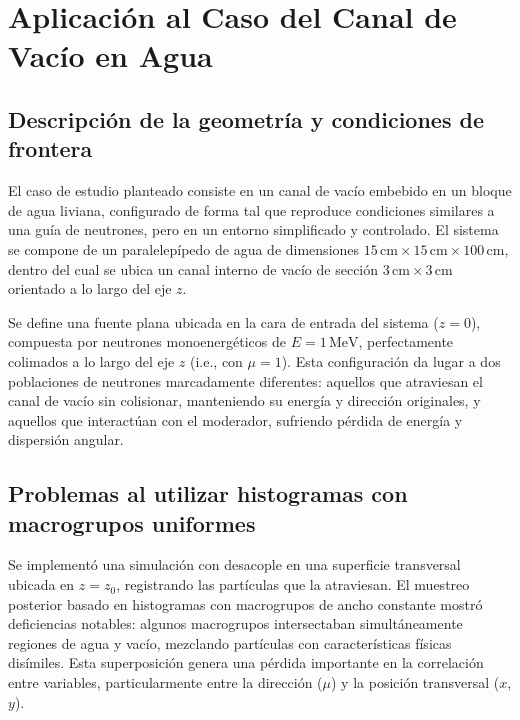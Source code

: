 \chapter{Aplicación al Caso del Canal de Vacío en Agua}

\section{Descripción de la geometría y condiciones de frontera}

El caso de estudio planteado consiste en un canal de vacío embebido en un bloque de agua liviana, configurado de forma tal que reproduce condiciones similares a una guía de neutrones, pero en un entorno simplificado y controlado. El sistema se compone de un paralelepípedo de agua de dimensiones $15\,\text{cm} \times 15\,\text{cm} \times 100\,\text{cm}$, dentro del cual se ubica un canal interno de vacío de sección $3\,\text{cm} \times 3\,\text{cm}$ orientado a lo largo del eje $z$.


Se define una fuente plana ubicada en la cara de entrada del sistema ($z = 0$), compuesta por neutrones monoenergéticos de $E = 1\,\text{MeV}$, perfectamente colimados a lo largo del eje $z$ (i.e., con $\mu = 1$). Esta configuración da lugar a dos poblaciones de neutrones marcadamente diferentes: aquellos que atraviesan el canal de vacío sin colisionar, manteniendo su energía y dirección originales, y aquellos que interactúan con el moderador, sufriendo pérdida de energía y dispersión angular.

\section{Problemas al utilizar histogramas con macrogrupos uniformes}

Se implementó una simulación con desacople en una superficie transversal ubicada en $z = z_0$, registrando las partículas que la atraviesan. El muestreo posterior basado en histogramas con macrogrupos de ancho constante mostró deficiencias notables: algunos macrogrupos intersectaban simultáneamente regiones de agua y vacío, mezclando partículas con características físicas disímiles. Esta superposición genera una pérdida importante en la correlación entre variables, particularmente entre la dirección ($\mu$) y la posición transversal ($x$, $y$).

